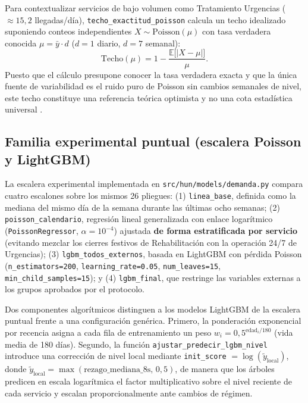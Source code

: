 Para contextualizar servicios de bajo volumen como Tratamiento Urgencias ($\approx 15{,}2$ llegadas/día), \texttt{techo\_exactitud\_poisson} calcula un techo idealizado suponiendo conteos independientes $X \sim \text{Poisson}(\mu)$ con tasa verdadera conocida $\mu = \bar{y}\cdot d$ ($d=1$ diario, $d=7$ semanal):
\begin{equation}
\label{eq:techo_poisson}
\text{Techo}(\mu) = 1 - \frac{\mathbb{E}\bigl[|X - \mu|\bigr]}{\mu}.
\end{equation}
Puesto que el cálculo presupone conocer la tasa verdadera exacta y que la única fuente de variabilidad es el ruido puro de Poisson sin cambios semanales de nivel, este techo constituye una referencia teórica optimista y no una cota estadística universal \parencite{mediflow2026demanda}.

\subsection{Familia experimental puntual (escalera Poisson y LightGBM)}

La escalera experimental implementada en \texttt{src/hun/models/demanda.py} compara cuatro escalones sobre los mismos 26 pliegues: (1) \texttt{linea\_base}, definida como la mediana del mismo día de la semana durante las últimas ocho semanas; (2) \texttt{poisson\_calendario}, regresión lineal generalizada con enlace logarítmico (\texttt{PoissonRegressor}, $\alpha = 10^{-4}$) ajustada \textbf{de forma estratificada por servicio} (evitando mezclar los cierres festivos de Rehabilitación con la operación 24/7 de Urgencias); (3) \texttt{lgbm\_todos\_externos}, basada en LightGBM \parencite{ke2017lightgbm} con pérdida Poisson (\texttt{n\_estimators=200}, \texttt{learning\_rate=0.05}, \texttt{num\_leaves=15}, \texttt{min\_child\_samples=15}); y (4) \texttt{lgbm\_final}, que restringe las variables externas a los grupos aprobados por el protocolo.

Dos componentes algorítmicos distinguen a los modelos LightGBM de la escalera puntual frente a una configuración genérica. Primero, la ponderación exponencial por recencia asigna a cada fila de entrenamiento un peso $w_i = 0{,}5^{\text{edad}_i / 180}$ (vida media de 180 días). Segundo, la función \texttt{ajustar\_predecir\_lgbm\_nivel} introduce una corrección de nivel local mediante \texttt{init\_score} $= \log(\tilde{y}_{\text{local}})$, donde $\tilde{y}_{\text{local}} = \max(\text{rezago\_mediana\_8s},\, 0{,}5)$, de manera que los árboles predicen en escala logarítmica el factor multiplicativo sobre el nivel reciente de cada servicio y escalan proporcionalmente ante cambios de régimen.

